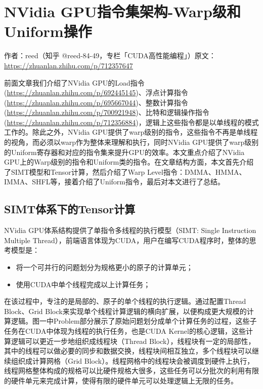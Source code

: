 \chapter{NVidia GPU指令集架构-Warp级和Uniform操作}

\begin{center}\small 作者：reed（知乎 @reed-84-49，专栏「CUDA高性能编程」）\quad 原文：\url{https://zhuanlan.zhihu.com/p/712357647}\end{center}

前面文章我们介绍了NVidia GPU的Load指令(\url{https://zhuanlan.zhihu.com/p/692445145})、浮点计算指令(\url{https://zhuanlan.zhihu.com/p/695667044})、整数计算指令(\url{https://zhuanlan.zhihu.com/p/700921948})、比特和逻辑操作指令(\url{https://zhuanlan.zhihu.com/p/712356884})，逻辑上这些指令都是以单线程的模式工作的。除此之外，NVidia GPU提供了warp级别的指令，这些指令不再是单线程的视角，而必须以warp作为整体来理解和执行，同时NVidia GPU提供了warp级别的Uniform寄存器和对应的指令集来提升GPU的效率。本文重点介绍了NVidia GPU上的Warp级别的指令和Uniform类的指令。在文章结构方面，本文首先介绍了SIMT模型和Tensor计算，然后介绍了Warp Level指令：DMMA、HMMA、IMMA、SHFL等，接着介绍了Uniform指令，最后对本文进行了总结。

\section{SIMT体系下的Tensor计算}

NVidia GPU体系结构提供了单指令多线程的执行模型（SIMT: Single Instruction Multiple Thread），前端语言体现为CUDA，用户在编写CUDA程序时，整体的思考模型是：

\begin{itemize}
\item 将一个可并行的问题划分为规格更小的原子的计算单元；
\item 使用CUDA中单个线程完成以上计算任务；
\end{itemize}

在该过程中，专注的是局部的、原子的单个线程的执行逻辑。通过配置Thread Block、Grid Block来实现单个线程计算逻辑的横向扩展，以便构成更大规模的计算逻辑。图一中Problem部分展示了原始问题划分成单个计算任务的过程，这些子任务在CUDA中体现为线程的执行任务，也是CUDA Kernel的核心逻辑，这些计算逻辑可以更近一步地组织成线程块（Thread Block），线程块有一定的局部性，其中的线程可以做必要的同步和数据交换，线程块间相互独立，多个线程块可以继续组织成计算网格（Grid Block）。线程网格中的线程块会被调度到硬件上执行，线程网格整体构成的规格可以比硬件规格大很多，这些任务可以分批次的利用有限的硬件单元来完成计算，使得有限的硬件单元可以处理逻辑上无限的任务。


